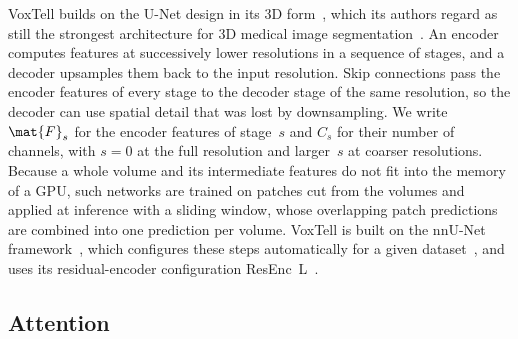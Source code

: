VoxTell builds on the U-Net design in its 3D form~\cite{3d_unet}, which its authors regard as still the strongest architecture for 3D medical image segmentation~\cite[p.~4]{rokuss2025voxtellfreetextpromptableuniversal}.
An encoder computes features at successively lower resolutions in a sequence of stages, and a decoder upsamples them back to the input resolution.
Skip connections pass the encoder features of every stage to the decoder stage of the same resolution, so the decoder can use spatial detail that was lost by downsampling.
We write $\mat{F}_s$ for the encoder features of stage~$s$ and $C_s$ for their number of channels, with $s = 0$ at the full resolution and larger~$s$ at coarser resolutions.
Because a whole volume and its intermediate features do not fit into the memory of a GPU, such networks are trained on patches cut from the volumes and applied at inference with a sliding window, whose overlapping patch predictions are combined into one prediction per volume.
VoxTell is built on the nnU-Net framework~\cite[Suppl.~p.~1]{rokuss2025voxtellfreetextpromptableuniversal}, which configures these steps automatically for a given dataset~\cite{isensee2018nnunetselfadaptingframeworkunetbased}, and uses its residual-encoder configuration ResEnc~L~\cite[Sec.~3.1]{isensee2024nnunetrevisited}.

\subsection{Attention}
\label{subsec:bg-attention}

